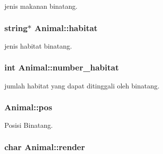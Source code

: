 jenis makanan binatang. 

\subsubsection[{\texorpdfstring{habitat}{habitat}}]{\setlength{\rightskip}{0pt plus 5cm}string$\ast$ Animal\+::habitat\hspace{0.3cm}{\ttfamily [private]}}\hypertarget{classAnimal_ab92cf1826b20ac02c8b342ac9517a9ba}{}\label{classAnimal_ab92cf1826b20ac02c8b342ac9517a9ba}


jenis habitat binatang. 

\subsubsection[{\texorpdfstring{number\+\_\+habitat}{number_habitat}}]{\setlength{\rightskip}{0pt plus 5cm}int Animal\+::number\+\_\+habitat\hspace{0.3cm}{\ttfamily [private]}}\hypertarget{classAnimal_a4dfc7016e0fc6b658f41edf9b7867e30}{}\label{classAnimal_a4dfc7016e0fc6b658f41edf9b7867e30}


jumlah habitat yang dapat ditinggali oleh binatang. 

\subsubsection[{\texorpdfstring{pos}{pos}}]{ Animal\+::pos\hspace{0.3cm}{\ttfamily [private]}}\hypertarget{classAnimal_ae4e9a6fe53c7ebfbb00536f0e38de5c8}{}\label{classAnimal_ae4e9a6fe53c7ebfbb00536f0e38de5c8}


Posisi Binatang. 

\subsubsection[{\texorpdfstring{render}{render}}]{\setlength{\rightskip}{0pt plus 5cm}char Animal\+::render\hspace{0.3cm}{\ttfamily [private]}}\hypertarget{classAnimal_a2651aa2a0b61dce72125919b52400550}{}\label{classAnimal_a2651aa2a0b61dce72125919b52400550}


